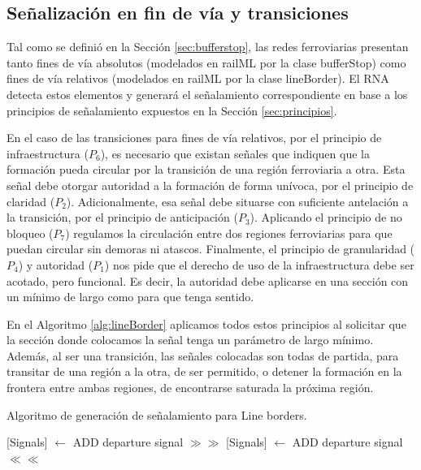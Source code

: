 \subsection{Señalización en fin de vía y transiciones}
    

    Tal como se definió en la Sección \ref{sec:bufferstop}, las redes ferroviarias presentan tanto fines de vía absolutos (modelados en railML por la clase bufferStop) como fines de vía relativos (modelados en railML por la clase lineBorder). El RNA detecta estos elementos y generará el señalamiento correspondiente en base a los principios de señalamiento expuestos en la Sección \ref{sec:principios}.

    En el caso de las transiciones para fines de vía relativos, por el principio de infraestructura ($P_6$), es necesario que existan señales que indiquen que la formación pueda circular por la transición de una región ferroviaria a otra. Esta señal debe otorgar autoridad a la formación de forma unívoca, por el principio de claridad ($P_2$). Adicionalmente, esa señal debe situarse con suficiente antelación a la transición, por el principio de anticipación ($P_3$). Aplicando el principio de no bloqueo ($P_7$) regulamos la circulación entre dos regiones ferroviarias para que puedan circular sin demoras ni atascos. Finalmente, el principio de granularidad ($P_4$) y autoridad ($P_1$) nos pide que el derecho de uso de la infraestructura debe ser acotado, pero funcional. Es decir, la autoridad debe aplicarse en una sección con un mínimo de largo como para que tenga sentido. 

    En el Algoritmo \ref{alg:lineBorder} aplicamos todos estos principios al solicitar que la sección donde colocamos la señal tenga un parámetro de largo mínimo. Además, al ser una transición, las señales colocadas son todas de partida, para transitar de una región a la otra, de ser permitido, o detener la formación en la frontera entre ambas regiones, de encontrarse saturada la próxima región.
    
    \begin{algorithm}[H]
        \caption{Algoritmo de generación de señalamiento para Line borders.}\label{alg:lineBorder}
        \DontPrintSemicolon
        \SetNoFillComment
        \LinesNotNumbered 
        {
            {
                {
                    [Signals] $\gets$ ADD departure signal $\gg\gg$\;
                }
                {
                    [Signals] $\gets$ ADD departure signal $\ll\ll$\;
                }
            }
        }
        \KwResult{[Signals]} 
    \end{algorithm}


